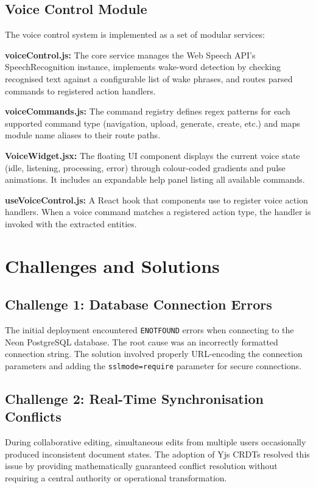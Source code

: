\documentclass[12pt,a4paper]{report}
\begin{document}
\subsection{Voice Control Module}

The voice control system is implemented as a set of modular services:

\textbf{voiceControl.js:} The core service manages the Web Speech API's SpeechRecognition instance, implements wake-word detection by checking recognised text against a configurable list of wake phrases, and routes parsed commands to registered action handlers.

\textbf{voiceCommands.js:} The command registry defines regex patterns for each supported command type (navigation, upload, generate, create, etc.) and maps module name aliases to their route paths.

\textbf{VoiceWidget.jsx:} The floating UI component displays the current voice state (idle, listening, processing, error) through colour-coded gradients and pulse animations. It includes an expandable help panel listing all available commands.

\textbf{useVoiceControl.js:} A React hook that components use to register voice action handlers. When a voice command matches a registered action type, the handler is invoked with the extracted entities.

\section{Challenges and Solutions}

\subsection{Challenge 1: Database Connection Errors}

The initial deployment encountered \texttt{ENOTFOUND} errors when connecting to the Neon PostgreSQL database. The root cause was an incorrectly formatted connection string. The solution involved properly URL-encoding the connection parameters and adding the \texttt{sslmode=require} parameter for secure connections.

\subsection{Challenge 2: Real-Time Synchronisation Conflicts}

During collaborative editing, simultaneous edits from multiple users occasionally produced inconsistent document states. The adoption of Yjs CRDTs resolved this issue by providing mathematically guaranteed conflict resolution without requiring a central authority or operational transformation.
\end{document}
